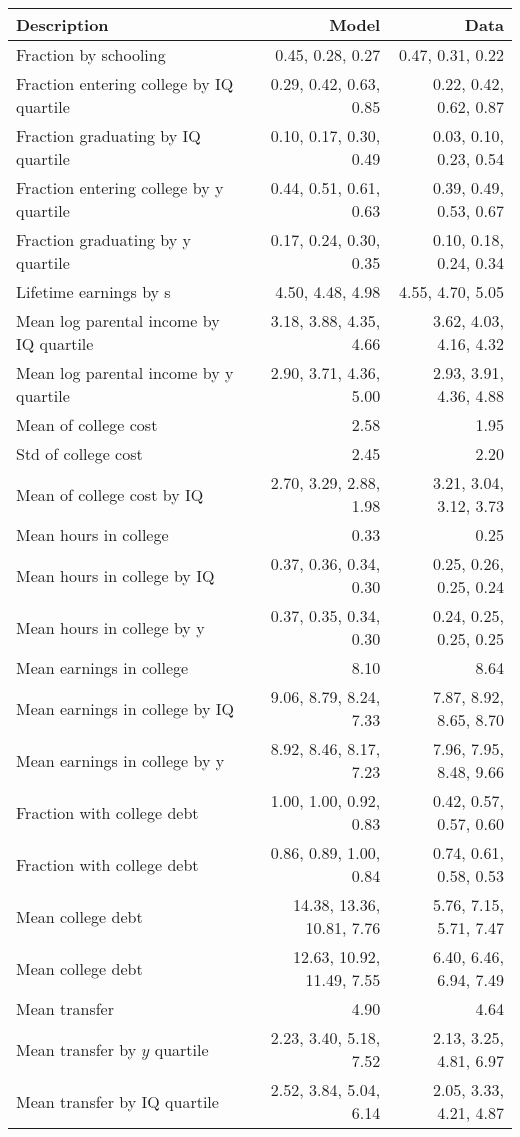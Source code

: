 \begin{tabular}{lrr}
\hline
Description & Model  & Data  \\
\hline
Fraction by schooling & 0.45, 0.28, 0.27  & 0.47, 0.31, 0.22  \\
Fraction entering college by IQ quartile & 0.29, 0.42, 0.63, 0.85  & 0.22, 0.42, 0.62, 0.87  \\
Fraction graduating by IQ quartile & 0.10, 0.17, 0.30, 0.49  & 0.03, 0.10, 0.23, 0.54  \\
Fraction entering college by y quartile & 0.44, 0.51, 0.61, 0.63  & 0.39, 0.49, 0.53, 0.67  \\
Fraction graduating by y quartile & 0.17, 0.24, 0.30, 0.35  & 0.10, 0.18, 0.24, 0.34  \\
Lifetime earnings by s & 4.50, 4.48, 4.98  & 4.55, 4.70, 5.05  \\
Mean log parental income by IQ quartile & 3.18, 3.88, 4.35, 4.66  & 3.62, 4.03, 4.16, 4.32  \\
Mean log parental income by y quartile & 2.90, 3.71, 4.36, 5.00  & 2.93, 3.91, 4.36, 4.88  \\
Mean of college cost & 2.58  & 1.95  \\
Std of college cost & 2.45  & 2.20  \\
Mean of college cost by IQ & 2.70, 3.29, 2.88, 1.98  & 3.21, 3.04, 3.12, 3.73  \\
Mean hours in college & 0.33  & 0.25  \\
Mean hours in college by IQ & 0.37, 0.36, 0.34, 0.30  & 0.25, 0.26, 0.25, 0.24  \\
Mean hours in college by y & 0.37, 0.35, 0.34, 0.30  & 0.24, 0.25, 0.25, 0.25  \\
Mean earnings in college & 8.10  & 8.64  \\
Mean earnings in college by IQ & 9.06, 8.79, 8.24, 7.33  & 7.87, 8.92, 8.65, 8.70  \\
Mean earnings in college by y & 8.92, 8.46, 8.17, 7.23  & 7.96, 7.95, 8.48, 9.66  \\
Fraction with college debt & 1.00, 1.00, 0.92, 0.83  & 0.42, 0.57, 0.57, 0.60  \\
Fraction with college debt & 0.86, 0.89, 1.00, 0.84  & 0.74, 0.61, 0.58, 0.53  \\
Mean college debt & 14.38, 13.36, 10.81, 7.76  & 5.76, 7.15, 5.71, 7.47  \\
Mean college debt & 12.63, 10.92, 11.49, 7.55  & 6.40, 6.46, 6.94, 7.49  \\
Mean transfer & 4.90  & 4.64  \\
Mean transfer by $y$ quartile & 2.23, 3.40, 5.18, 7.52  & 2.13, 3.25, 4.81, 6.97  \\
Mean transfer by IQ quartile & 2.52, 3.84, 5.04, 6.14  & 2.05, 3.33, 4.21, 4.87  \\
\hline
\end{tabular}%
